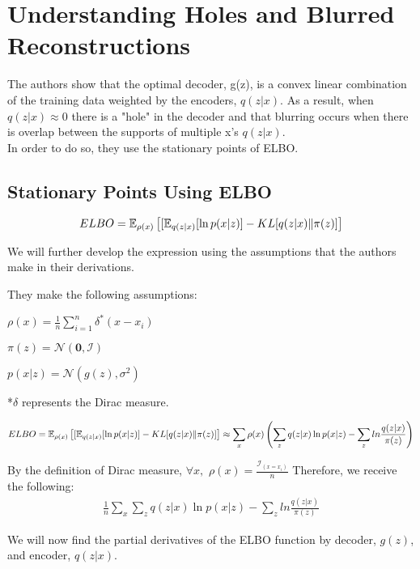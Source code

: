 \chapter*{Understanding Holes and Blurred Reconstructions}
The authors show that the optimal decoder, g(z), is a convex linear combination of the training data weighted by the encoders, $q(z|x)$.
As a result, when $q(z|x)\approx 0$ there is a "hole" in the decoder and that blurring occurs when there is overlap between the supports of multiple x's $q(z|x)$.\\
In order to do so, they use the stationary points of ELBO.

\section*{Stationary Points Using ELBO}
\begin{gather*}
{ELBO} =  \operatorname{\mathbb{E}}_{\rho(x)}\left[[\operatorname{\mathbb{E}}_{q(z|x)}[\ln{p(x|z)}] - KL[q(z|x) \| \pi(z)]\right]
\end{gather*}

We will further develop the expression using the assumptions that the authors make in their derivations.

\raggedright
They make the following assumptions:\par

\centering
$\rho(x) = \frac{1}{n} \sum_{i=1}^{n}\delta^*(x-x_i)$

$\pi(z) = \mathcal{N}(\textbf{0}, \mathcal{I})$

$p(x|z) = \mathcal{N}(g(z), \sigma^2)$
\par

\raggedright
*$\delta$ represents the Dirac measure.
\par

\begin{gather*}
{ELBO} =  \operatorname{\mathbb{E}}_{\rho(x)}\left[[\operatorname{\mathbb{E}}_{q(z|x)}[\ln{p(x|z)}] - KL[q(z|x) \| \pi(z)]\right]
\approx \sum_{x}\rho(x)\left(\sum_{z} q(z|x) \ln{p(x|z)} - \sum_{z} ln \frac{q(z|x)}{\pi(z)}\right)
\end{gather*}

By the definition of Dirac measure, $\forall x,$  $\rho(x) = \frac{\mathcal{I}_{(x=x_i)}}{n}$
Therefore, we receive the following:
\begin{gather*}
\frac{1}{n}\sum_{x}\sum_{z} q(z|x) \ln{p(x|z)} - \sum_{z} ln \frac{q(z|x)}{\pi(z)}
\end{gather*}
\par

We will now find the partial derivatives of the ELBO function by decoder, $g(z)$, and encoder, $q(z|x)$.
\par

